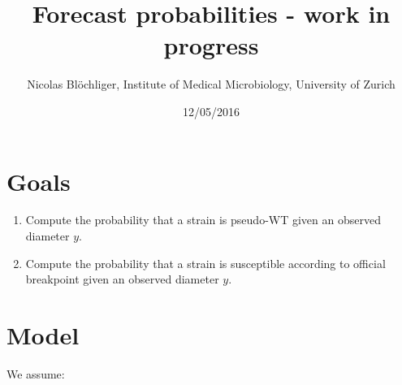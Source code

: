\documentclass[]{article}
\title{Forecast probabilities - work in progress}
\author{Nicolas Blöchliger, Institute of Medical Microbiology, University of
Zurich}
\date{12/05/2016}
\begin{document}
\maketitle


{
\hypersetup{linkcolor=black}
\setcounter{tocdepth}{2}
\tableofcontents
}
\section{Goals}\label{goals}

\label{sec:goals}

\begin{enumerate}
\itemsep1pt\parskip0pt
\item
  Compute the probability that a strain is pseudo-WT given an observed
  diameter \(y\).
\item
  Compute the probability that a strain is susceptible according to
  official breakpoint given an observed diameter \(y\).
\end{enumerate}

\section{Model}\label{model}

We assume:
\end{document}
